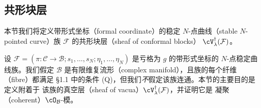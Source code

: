 
\subsection{共形块层}

{\emergencystretch=2.8pt 本节我们将定义带形式坐标（formal coordinate）的稳定 $N$-点曲线（stable
$N$-pointed curve）族 $\mathcal{F}$ 的共形块层（sheaf of conformal blocks）
$\cV_\lambda^\dagger(\mathcal{F})$。\par}

设 $\mathcal{F}=(\pi:\mathcal{C}\to\mathcal{B};s_1,\dots,s_N;
\eta_1,\dots,\eta_N)$ 是亏格为 $g$ 的带形式坐标的 $N$-点稳定曲线族。我们假定
$\mathcal{B}$ 是有限维复流形（complex manifold），且族的每个纤维（fibre）都满足
§1.1 中的条件 (Q)，但我们\emph{不}假定该族连通。本节的主要目的是定义附着于
该族的真空层（sheaf of vacua）$\cV_\lambda^\dagger(\mathcal{F})$，并证明它是
凝聚（coherent）$\cO_\mathcal{B}$-模。

